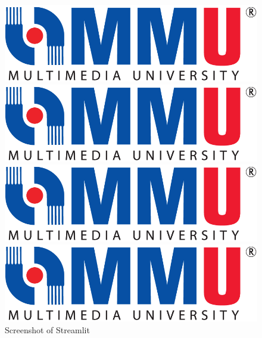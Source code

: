 \documentclass[12pt,a4paper,oneside]{article}
\begin{document}
\begin{figure}[h]
\begin{multicols}{2}
    \includegraphics[width=\linewidth]{mmu.png}\par 
    \includegraphics[width=\linewidth]{mmu.png}\par 
    \end{multicols}
\begin{multicols}{2}
    \includegraphics[width=\linewidth]{mmu.png}\par
    \includegraphics[width=\linewidth]{mmu.png}\par
\end{multicols}
\caption{Screenshot of Streamlit}
\end{figure}
\end{document}
